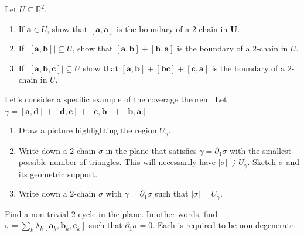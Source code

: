 \documentclass[12 pt, letterpaper]{hmcpset}
\begin{document}
\pagebreak

\begin{problem}[24.]
	Let $U \subseteq \mathbb{R}^{2}$.
	\begin{enumerate}
		\item If $\mathbf{a} \in U$, show that $[\mathbf{a}, \mathbf{a}]$ is the boundary of a $2$-chain in $\mathbf{U}$.
		\item If $\lvert [\mathbf{a}, \mathbf{b}] \rvert \subseteq U$, show that $[\mathbf{a}, \mathbf{b}] + [\mathbf{b}, \mathbf{a}]$ is the boundary of a $2$-chain in $U$.
		\item If $\lvert [\mathbf{a}, \mathbf{b}, \mathbf{c}] \rvert \subseteq U$ show that $[\mathbf{a}, \mathbf{b}] + [\mathbf{b} \mathbf{c}] + [\mathbf{c}, \mathbf{a}]$ is the boundary of a $2$-chain in $U$.
	\end{enumerate}
\end{problem}

\pagebreak

\begin{problem}[25.]
	Let's consider a specific example of the coverage theorem. Let $\gamma = [\mathbf{a}, \mathbf{d}] + [\mathbf{d}, \mathbf{c}] + [\mathbf{c}, \mathbf{b}] + [\mathbf{b}, \mathbf{a}]$:
	\begin{enumerate}
		\item Draw a picture highlighting the region $U_{\gamma}$.
		\item Write down a $2$-chain $\sigma$ in the plane that satisfies $\gamma = \partial_{1} \sigma$ with the smallest possible number of triangles. This will necessarily have $\lvert \sigma \rvert \supsetneq U_{\gamma}$. Sketch $\sigma$ and its geometric support.
		\item Write down a $2$-chain $\sigma$ with $\gamma = \partial_{1} \sigma$ such that $\lvert \sigma \rvert = U_{\gamma}$.
	\end{enumerate}
\end{problem}

\pagebreak

\begin{problem}[26.]
	Find a non-trivial $2$-cycle in the plane. In other words, find $\sigma = \sum_{k} \lambda_{k} [\mathbf{a}_{k}, \mathbf{b}_{k}, \mathbf{c}_{k}]$ such that $\partial_{1} \sigma = 0$. Each is required to be non-degenerate.
\end{problem}
\end{document}
